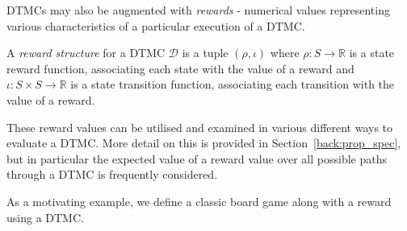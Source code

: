 DTMCs may also be augmented with \emph{rewards} - numerical values representing various characteristics of a particular execution of a DTMC.

\begin{definition}
\label{back:reward_structure}

A \emph{reward structure} for a DTMC $\mathcal{D}$ is a tuple $(\rho, \iota)$ where $\rho : S \rightarrow \mathbb{R}$ is a state reward function, associating each state with the value of a reward and $\iota : S \times S \rightarrow \mathbb{R}$ is a state transition function, associating each transition with the value of a reward.
\end{definition}

These reward values can be utilised and examined in various different ways to evaluate a DTMC. More detail on this is provided in Section~\ref{back:prop_spec}, but in particular the expected value of a reward value over all possible paths through a DTMC is frequently considered.

As a motivating example, we define a classic board game along with a reward using a DTMC.

